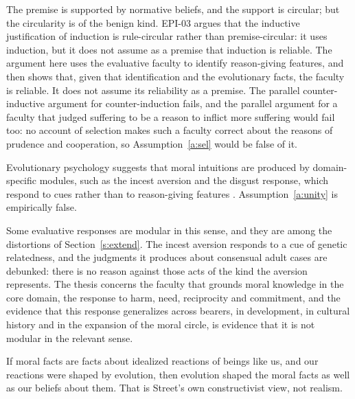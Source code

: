 \documentclass{situationist-preprint}
\begin{document}
\begin{reply}
The premise is supported by normative beliefs, and the support is circular; but the circularity is of the benign kind. EPI-03 argues that the inductive justification of induction is rule-circular rather than premise-circular: it uses induction, but it does not assume as a premise that induction is reliable. The argument here uses the evaluative faculty to identify reason-giving features, and then shows that, given that identification and the evolutionary facts, the faculty is reliable. It does not assume its reliability as a premise. The parallel counter-inductive argument for counter-induction fails, and the parallel argument for a faculty that judged suffering to be a reason to inflict more suffering would fail too: no account of selection makes such a faculty correct about the reasons of prudence and cooperation, so Assumption~\ref{a:sel} would be false of it.
\end{reply}

\begin{objection}[Modularity]
Evolutionary psychology suggests that moral intuitions are produced by domain-specific modules, such as the incest aversion and the disgust response, which respond to cues rather than to reason-giving features \citep{Haidt2001}. Assumption~\ref{a:unity} is empirically false.
\end{objection}

\begin{reply}
Some evaluative responses are modular in this sense, and they are among the distortions of Section~\ref{s:extend}. The incest aversion responds to a cue of genetic relatedness, and the judgments it produces about consensual adult cases are debunked: there is no reason against those acts of the kind the aversion represents. The thesis concerns the faculty that grounds moral knowledge in the core domain, the response to harm, need, reciprocity and commitment, and the evidence that this response generalizes across bearers, in development, in cultural history and in the expansion of the moral circle, is evidence that it is not modular in the relevant sense.
\end{reply}

\begin{objection}
If moral facts are facts about idealized reactions of beings like us, and our reactions were shaped by evolution, then evolution shaped the moral facts as well as our beliefs about them. That is Street's own constructivist view, not realism.
\end{objection}
\end{document}
